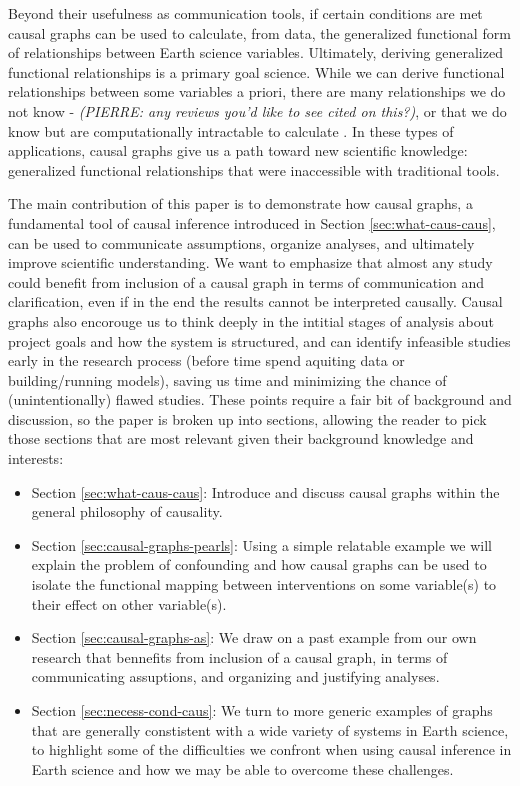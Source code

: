 \documentclass[12pt]{article}
\begin{document}
Beyond their usefulness as communication tools, if certain conditions
are met causal graphs can be used to calculate, from data, the
generalized functional form of relationships between Earth science
variables. Ultimately, deriving generalized functional relationships
is a primary goal science. While we can derive functional
relationships between some variables a priori, there are many
relationships we do not know \citep[e.g., ecosystem scale water and
carbon fluxes][]{massmann-2019} - \textit{(PIERRE: any reviews you'd
  like to see cited on this?)}, or that we do know but are
computationally intractable to calculate \citep[e.g., clouds and
microophysics at the global scale][]{randall2003, gentine2018,
  zadra2018} . In these types of applications, causal graphs give us a
path toward new scientific knowledge: generalized functional
relationships that were inaccessible with traditional tools.

The main contribution of this paper is to demonstrate how causal
graphs, a fundamental tool of causal inference introduced in Section
\ref{sec:what-caus-caus}, can be used to communicate assumptions, organize analyses, and
ultimately improve scientific understanding. We want to emphasize that
almost any study could benefit from inclusion of a causal graph in
terms of communication and clarification, even if in the end the
results cannot be interpreted causally. Causal graphs also encorouge
us to think deeply in the intitial stages of analysis about project
goals and how the system is structured, and can identify infeasible
studies early in the research process (before time spend aquiting data
or building/running models), saving us time and minimizing the chance
of (unintentionally) flawed studies. These points require a fair bit
of background and discussion, so the paper is broken up into sections,
allowing the reader to pick those sections that are most relevant
given their background knowledge and interests:

\begin{itemize}
\item Section \ref{sec:what-caus-caus}: Introduce and discuss causal graphs within the
  general philosophy of causality.
\item Section \ref{sec:causal-graphs-pearls}: Using a simple relatable example we will explain
  the problem of confounding and how causal graphs can be used to
  isolate the functional mapping between interventions on some
  variable(s) to their effect on other variable(s).
\item Section \ref{sec:causal-graphs-as}: We draw on a past example
  from our own research that bennefits from inclusion of a causal
  graph, in terms of communicating assuptions, and organizing and
  justifying analyses.
\item Section \ref{sec:necess-cond-caus}: We turn to more generic
  examples of graphs that are generally constistent with a wide
  variety of systems in Earth science, to highlight some of the
  difficulties we confront when using causal inference in Earth
  science and how we may be able to overcome these challenges.
\end{itemize}
\end{document}
